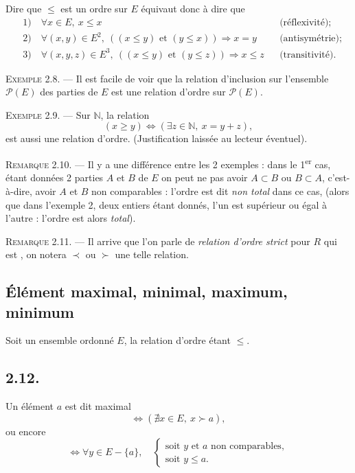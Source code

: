 Dire que $\le$ est un ordre sur $E$ équivaut donc à dire que
\begin{align*}
&1)\quad \forall x\in E,\ x\le x &&\text{(réflexivité)};\\
&2)\quad \forall(x,y)\in E^2,\ ((x\le y)\text{ et }(y\le x))\Rightarrow x=y &&\text{(antisymétrie)};\\
&3)\quad \forall(x,y,z)\in E^3,\ ((x\le y)\text{ et }(y\le z))\Rightarrow x\le z &&\text{(transitivité)}.
\end{align*}

\medskip\noindent\textsc{Exemple 2.8.} --- Il est facile de voir que la relation d'inclusion sur l'ensemble $\mathcal P(E)$ des parties de $E$ est une relation d'ordre sur $\mathcal P(E)$.

\medskip\noindent\textsc{Exemple 2.9.} --- Sur $\mathbb N$, la relation
\[
(x\ge y)\Leftrightarrow(\exists z\in\mathbb N,\ x=y+z),
\]
est aussi une relation d'ordre. (Justification laissée au lecteur éventuel).

\medskip\noindent\textsc{Remarque 2.10.} --- Il y a une différence entre les 2 exemples : dans le 1\textsuperscript{er} cas, étant données 2 parties $A$ et $B$ de $E$ on peut ne pas avoir $A\subset B$ ou $B\subset A$, c'est-à-dire, avoir $A$ et $B$ non comparables : l'ordre est dit \emph{non total} dans ce cas, (alors que dans l'exemple 2, deux entiers étant donnés, l'un est supérieur ou égal à l'autre : l'ordre est alors \emph{total}).

\medskip\noindent\textsc{Remarque 2.11.} --- Il arrive que l'on parle de \emph{relation d'ordre strict} pour  $R$ qui est , on notera $\prec$ ou $\succ$ une telle relation.

\subsection*{Élément maximal, minimal, maximum, minimum}

Soit un ensemble ordonné $E$, la relation d'ordre étant  $\le$.

\subsection*{2.12.}
Un élément $a$ est dit maximal
\[
\Leftrightarrow (\nexists x\in E,\ x\succ a),
\]
ou encore
\[
\Leftrightarrow \forall y\in E-\{a\},\quad
\begin{cases}
\text{soit }y\text{ et }a\text{ non comparables},\\
\text{soit }y\le a.
\end{cases}
\]

